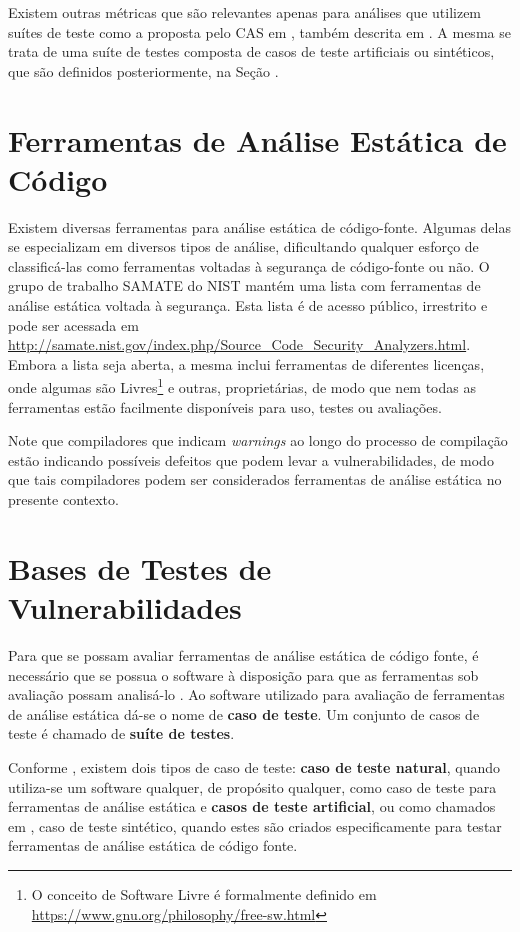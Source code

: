   Existem outras métricas que são relevantes apenas para análises que utilizem suítes de teste como a proposta pelo CAS em \cite{nsa}, também descrita em \cite{juliet}. A mesma se trata de uma suíte de testes composta de casos de teste artificiais ou sintéticos, que são definidos posteriormente, na Seção .

  \section{Ferramentas de Análise Estática de Código}

  Existem diversas ferramentas para análise estática de código-fonte. Algumas delas se especializam em diversos tipos de análise, dificultando qualquer esforço de classificá-las como ferramentas voltadas à segurança de código-fonte ou não. O grupo de trabalho SAMATE do  NIST mantém uma lista com ferramentas de análise estática voltada à segurança. Esta lista é de acesso público, irrestrito e pode ser acessada em \url{http://samate.nist.gov/index.php/Source_Code_Security_Analyzers.html}. Embora a lista seja aberta, a mesma inclui ferramentas de diferentes licenças, onde algumas são Livres\footnote{O conceito de Software Livre é formalmente definido em \url{https://www.gnu.org/philosophy/free-sw.html}} e outras, proprietárias, de modo que nem todas as ferramentas estão facilmente disponíveis para uso, testes ou avaliações.

  Note que compiladores que indicam \textit{warnings} ao longo do processo de compilação estão indicando possíveis defeitos que podem levar a vulnerabilidades, de modo que tais compiladores podem ser considerados ferramentas de análise estática no presente contexto.


  \section{Bases de Testes de Vulnerabilidades}\label{fundamentacao_teorica:bases_de_testes_de_vulnerabilidades}

  Para que se possam avaliar ferramentas de análise estática de código fonte, é necessário que se possua o software à disposição para que as ferramentas sob avaliação possam analisá-lo \cite{nsa}. Ao software utilizado para avaliação de ferramentas de análise estática dá-se o nome de \textbf{caso de teste}. Um conjunto de casos de teste é chamado de \textbf{suíte de testes}.

  Conforme \cite{nsa}, existem dois tipos de caso de teste: \textbf{caso de teste natural}, quando utiliza-se um software qualquer, de propósito qualquer, como caso de teste para ferramentas de análise estática e \textbf{casos de teste artificial}, ou como chamados em \cite {juliet}, caso de teste sintético, quando estes são criados especificamente para testar ferramentas de análise estática de código fonte.

